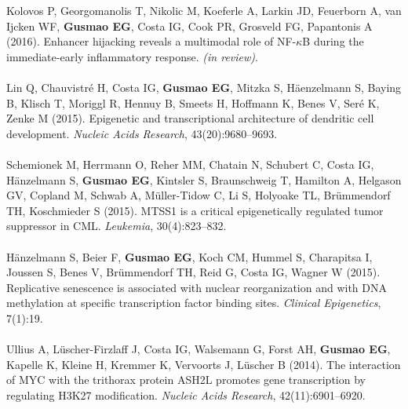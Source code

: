 \begin{addmargin}{0.05\textwidth}
\noindent
Kolovos P, Georgomanolis T, Nikolic M, Koeferle A, Larkin JD, Feuerborn A, van Ijcken WF, \textbf{Gusmao EG}, Costa IG, Cook PR, Grosveld FG, Papantonis A (2016). Enhancer hijacking reveals a multimodal role of NF-$\kappa$B during the immediate-early inflammatory response. \textit{(in review)}.\\ \\
\noindent
Lin Q, Chauvistr\'{e} H, Costa IG, \textbf{Gusmao EG}, Mitzka S, H\"{a}enzelmann S, Baying B, Klisch T, Moriggl R, Hennuy B, Smeets H, Hoffmann K, Benes V, Ser\'{e} K, Zenke M (2015). Epigenetic and transcriptional architecture of dendritic cell development. \textit{Nucleic Acids Research}, 43(20):9680--9693.\\ \\
\noindent
Schemionek M, Herrmann O, Reher MM, Chatain N, Schubert C, Costa IG, \linebreak H\"{a}nzelmann S, \textbf{Gusmao EG}, Kintsler S, Braunschweig T, Hamilton A, Helgason GV, Copland M, Schwab A, M\"{u}ller-Tidow C, Li S, Holyoake TL, Br\"{u}mmendorf TH, \linebreak Koschmieder S (2015). MTSS1 is a critical epigenetically regulated tumor suppressor in CML. \textit{Leukemia}, 30(4):823--832. \\ \\
\noindent
H\"{a}nzelmann S, Beier F, \textbf{Gusmao EG}, Koch CM, Hummel S, Charapitsa I, Joussen S, Benes V, Br\"{u}mmendorf TH, Reid G, Costa IG, Wagner W (2015). Replicative senescence is associated with nuclear reorganization and with DNA methylation at specific transcription factor binding sites. \textit{Clinical Epigenetics}, 7(1):19. \\ \\
\noindent
Ullius A, L\"{u}scher-Firzlaff J, Costa IG, Walsemann G, Forst AH, \textbf{Gusmao EG}, Kapelle K, Kleine H, Kremmer K, Vervoorts J, L\"{u}scher B (2014). The interaction of MYC with the trithorax protein ASH2L promotes gene transcription by regulating H3K27 modification. \textit{Nucleic Acids Research}, 42(11):6901--6920. \\ \\
\end{addmargin} 


